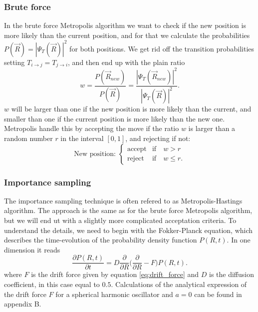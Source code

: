 \documentclass[norsk,a4paper,12pt]{article}
\begin{document}
\subsubsection{Brute force}
In the brute force Metropolis algorithm we want to check if the new position is more likely than the current position, and for that we calculate the probabilities $P(\vec{R})=|\Psi_T(\vec{R})|^2$ for both positions. We get rid off the transition probabilities setting $T_{i\rightarrow j}=T_{j\rightarrow i}$, and then end up with the plain ratio
\begin{equation}
w=\frac{P(\vec{R}_{new})}{P(\vec{R})}=\frac{|\Psi_T(\vec{R}_{new})|^2}{|\Psi_T(\vec{R})|^2}.
\end{equation}
$w$ will be larger than one if the new position is more likely than the current, and smaller than one if the current position is more likely than the new one. Metropolis handle this by accepting the move if the ratio $w$ is larger than a random number $r$ in the interval $[0,1]$, and rejecting if not:
\begin{equation}
\text{New position: }
\begin{cases} 
   \text{accept} & \text{if}\quad w > r \\
   \text{reject} & \text{if}\quad w \leq r.
\end{cases}
\end{equation}

\subsubsection{Importance sampling} \label{Importance_sampling}
The importance sampling technique is often refered to as Metropolis-Hastings algorithm. The approach is the same as for the brute force Metropolis algorithm, but we will end ut with a slightly more complicated acceptation criteria. To understand the details, we need to begin with the Fokker-Planck equation, which describes the time-evolution of the probability density function $P(R,t)$. In one dimension it reads
\begin{equation}
\frac{\partial P(R,t)}{\partial t} = D\frac{\partial}{\partial R}\bigg(\frac{\partial}{\partial R} - F\bigg)P(R,t).
\end{equation}
where $F$ is the drift force given by equation \ref{eq:drift_force} and $D$ is the diffusion coefficient, in this case equal to $0.5$. Calculations of the analytical expression of the drift force $F$ for a spherical harmonic oscillator and $a=0$ can be found in appendix B.
\end{document}
